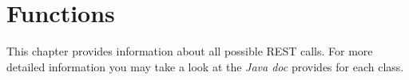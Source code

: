 \section{Functions}

	This chapter provides information about all possible REST calls.
	For more detailed information you may take a look at the \textit{Java doc} provides for each class.


\newpage
		

\newpage


\newpage
	 

\newpage


\newpage